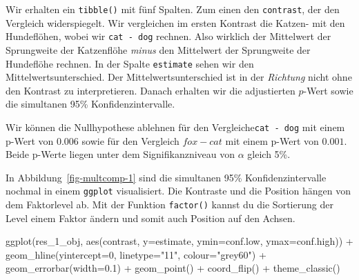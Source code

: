 \documentclass[
  letterpaper,
  DIV=11,
  oneside]{scrreport}
\newenvironment{Shaded}{\begin{snugshade}}{\end{snugshade}}
\newcommand{\AttributeTok}[1]{\textcolor[rgb]{0.40,0.45,0.13}{#1}}
\newcommand{\DecValTok}[1]{\textcolor[rgb]{0.68,0.00,0.00}{#1}}
\newcommand{\FloatTok}[1]{\textcolor[rgb]{0.68,0.00,0.00}{#1}}
\newcommand{\FunctionTok}[1]{\textcolor[rgb]{0.28,0.35,0.67}{#1}}
\newcommand{\NormalTok}[1]{\textcolor[rgb]{0.00,0.23,0.31}{#1}}
\newcommand{\SpecialCharTok}[1]{\textcolor[rgb]{0.37,0.37,0.37}{#1}}
\newcommand{\StringTok}[1]{\textcolor[rgb]{0.13,0.47,0.30}{#1}}
\begin{document}
Wir erhalten ein \texttt{tibble()} mit fünf Spalten. Zum einen den
\texttt{contrast}, der den Vergleich widerspiegelt. Wir vergleichen im
ersten Kontrast die Katzen- mit den Hundeflöhen, wobei wir
\texttt{cat\ -\ dog} rechnen. Also wirklich der Mittelwert der
Sprungweite der Katzenflöhe \emph{minus} den Mittelwert der Sprungweite
der Hundeflöhe rechnen. In der Spalte \texttt{estimate} sehen wir den
Mittelwertsunterschied. Der Mittelwertsunterschied ist in der
\emph{Richtung} nicht ohne den Kontrast zu interpretieren. Danach
erhalten wir die adjustierten \(p\)-Wert sowie die simultanen 95\%
Konfidenzintervalle.

Wir können die Nullhypothese ablehnen für den
Vergleiche\texttt{cat\ -\ dog} mit einem p-Wert von \(0.006\) sowie für
den Vergleich \(fox - cat\) mit einem p-Wert von \(0.001\). Beide
p-Werte liegen unter dem Signifikanzniveau von \(\alpha\) gleich 5\%.

In Abbildung~\ref{fig-multcomp-1} sind die simultanen 95\%
Konfidenzintervalle nochmal in einem \texttt{ggplot} visualisiert. Die
Kontraste und die Position hängen von dem Faktorlevel ab. Mit der
Funktion \texttt{factor()} kannst du die Sortierung der Level einem
Faktor ändern und somit auch Position auf den Achsen.

\begin{Shaded}
\begin{Highlighting}[]
  \FunctionTok{ggplot}\NormalTok{(res\_1\_obj, }\FunctionTok{aes}\NormalTok{(contrast, }\AttributeTok{y=}\NormalTok{estimate, }
                        \AttributeTok{ymin=}\NormalTok{conf.low, }\AttributeTok{ymax=}\NormalTok{conf.high)) }\SpecialCharTok{+}
    \FunctionTok{geom\_hline}\NormalTok{(}\AttributeTok{yintercept=}\DecValTok{0}\NormalTok{, }\AttributeTok{linetype=}\StringTok{"11"}\NormalTok{, }\AttributeTok{colour=}\StringTok{"grey60"}\NormalTok{) }\SpecialCharTok{+}
    \FunctionTok{geom\_errorbar}\NormalTok{(}\AttributeTok{width=}\FloatTok{0.1}\NormalTok{) }\SpecialCharTok{+} 
    \FunctionTok{geom\_point}\NormalTok{() }\SpecialCharTok{+}
    \FunctionTok{coord\_flip}\NormalTok{() }\SpecialCharTok{+}
    \FunctionTok{theme\_classic}\NormalTok{()}
\end{Highlighting}
\end{Shaded}
\end{document}
